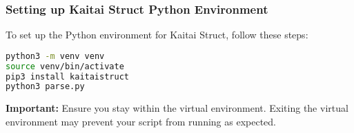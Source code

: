 \begin{frame}[fragile]
    \frametitle{Setting up Kaitai Struct Python Environment}

    To set up the Python environment for Kaitai Struct, follow these steps:



    \begin{lstlisting}[language=bash,frame=single]
python3 -m venv venv
source venv/bin/activate
pip3 install kaitaistruct
python3 parse.py
    \end{lstlisting}

    \textbf{Important:} Ensure you stay within the virtual environment. Exiting the virtual environment may prevent your script from running as expected.
\end{frame}



